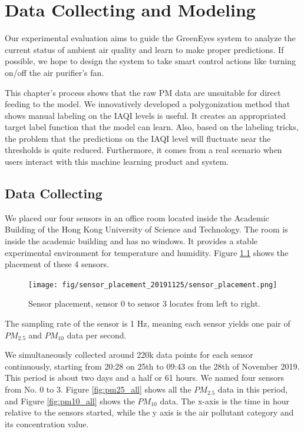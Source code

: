 \chapter{Data Collecting and Modeling}\label{chap:data_collecting_modeling}
Our experimental evaluation aims to guide the GreenEyes system to analyze the current status of ambient air quality and learn to make proper predictions. If possible, we hope to design the system to take smart control actions like turning on/off the air purifier's fan.

This chapter's process shows that the raw PM data are unsuitable for direct feeding to the model. We innovatively developed a polygonization method that shows manual labeling on the IAQI levels is useful. It creates an appropriated target label function that the model can learn. Also, based on the labeling tricks, the problem that the predictions on the IAQI level will fluctuate near the thresholds is quite reduced. Furthermore, it comes from a real scenario when users interact with this machine learning product and system.

\section{Data Collecting}

We placed our four sensors in an office room located inside the Academic Building of the Hong Kong University of Science and Technology. The room is inside the academic building and has no windows. It provides a stable experimental environment for temperature and humidity. Figure \ref{fig:sensor_placement} shows the placement of these 4 sensors.

\begin{figure}[!htbp]
    \begin{center}
    \texttt{[image: fig/sensor\_placement\_20191125/sensor\_placement.png]}
    \end{center}
    \caption{Sensor placement, sensor 0 to sensor 3 locates from left to right.}
    \label{fig:sensor_placement}
\end{figure}

The sampling rate of the sensor is 1 Hz, meaning each sensor yields one pair of $PM_{2.5}$ and $PM_{10}$ data per second.

We simultaneously collected around 220k data points for each sensor continuously, starting from 20:28 on 25th to 09:43 on the 28th of November 2019. This period is about two days and a half or 61 hours. We named four sensors from No. 0 to 3. Figure \ref{fig:pm25_all} shows all the $PM_{2.5}$ data in this period, and Figure \ref{fig:pm10_all} shows the $PM_{10}$ data. The x-axis is the time in hour relative to the sensors started, while the y axis is the air pollutant category and its concentration value.

